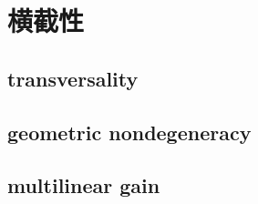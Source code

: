 \section{横截性}
\label{b2:sec:2502}


\subsection{transversality}
\label{b2:subsec:250201}

\subsection{geometric nondegeneracy}
\label{b2:subsec:250202}

\subsection{multilinear gain}
\label{b2:subsec:250203}


